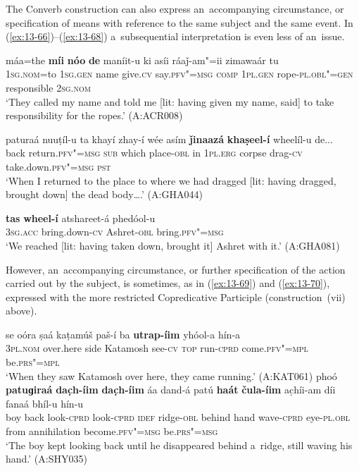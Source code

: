  The Converb construction can also express an~accompanying circumstance, or specification of means with reference to the same subject and the same event. In (\ref{ex:13-66})--(\ref{ex:13-68}) a~subsequential interpretation is even less of an~issue.

\ea
\label{ex:13-66}
\gll máa=the \textbf{míi} \textbf{nóo} \textbf{de} maníit-u ki asíi ráaǰ-am"=ii zimawaár tu  \\
\textsc{1sg.nom}=to \textsc{1sg.gen} name give.\textsc{cv} say.\textsc{pfv"=msg} \textsc{comp}  \textsc{1pl.gen} rope-\textsc{pl.obl"=gen} responsible \textsc{2sg.nom}  \\
\glt `They called my name and told me [lit: having given my name, said] to take responsibility for the ropes.' (A:ACR008)

\ex
\label{ex:13-67}
\gll paturaá nuuṭíl-u ta khayí zhay-í wée asím \textbf{ǰinaazá} \textbf{khaṣeel-í} wheelíl-u de... \\
back return.\textsc{pfv"=msg} \textsc{sub} which place-\textsc{obl} in \textsc{1pl.erg}  corpse drag-\textsc{cv} take.down.\textsc{pfv"=msg} \textsc{pst} \\
\glt `When I returned to the place to where we had dragged [lit: having dragged, brought down] the dead body{\ldots}.' (A:GHA044)

\ex
\label{ex:13-68}
\gll \textbf{tas} \textbf{wheel-í} atshareet-á phedóol-u\\
\textsc{3sg.acc} bring.down-\textsc{cv} Ashret-\textsc{obl} bring.\textsc{pfv"=msg} \\
\glt `We reached [lit: having taken down, brought it] Ashret with it.' (A:GHA081) 
\z

However, an~accompanying circumstance, or further specification of the action carried out by the subject, is sometimes, as in (\ref{ex:13-69}) and (\ref{ex:13-70}), expressed with the more restricted Copredicative Participle (construction~(vii) above).

\ea
\label{ex:13-69}
\gll se oóra ṣaá kaṭamúš paš-í ba \textbf{utrap-íim} yhóol-a hín-a \\
\textsc{3pl.nom} over.here side Katamosh see-\textsc{cv} \textsc{top} run-\textsc{cprd} come.\textsc{pfv"=mpl} be.\textsc{prs"=mpl} \\
\glt `When they saw Katamosh over here, they came running.' (A:KAT061)
\ex
\label{ex:13-70}
\gll phoó \textbf{patuɡiraá} \textbf{dac̣h-íim} \textbf{dac̣h-íim} áa dand-á patú \textbf{haát} \textbf{čula-íim} ac̣híi-am díi fanaá bhíl-u hín-u\\
boy back look-\textsc{cprd} look-\textsc{cprd} \textsc{idef}  ridge-\textsc{obl} behind hand wave-\textsc{cprd} eye-\textsc{pl.obl} from  annihilation become.\textsc{pfv"=msg} be.\textsc{prs"=msg}\\
\glt `The boy kept looking back until he disappeared behind a~ridge, still waving his hand.' (A:SHY035) 
\z

